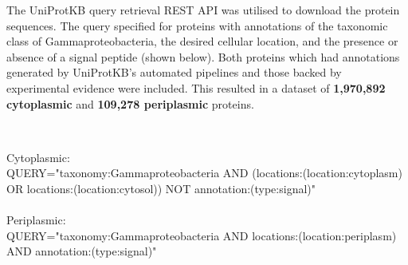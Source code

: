 The UniProtKB query retrieval REST API was utilised to download the protein sequences.
The query specified for proteins with annotations of the taxonomic class of Gammaproteobacteria, 
the desired cellular location,
and the presence or absence of a signal peptide (shown below).
Both proteins which had annotations generated by UniProtKB's automated pipelines and those backed by experimental evidence were included.
This resulted in a dataset of \textbf{1,970,892 cytoplasmic} and \textbf{109,278 periplasmic} proteins.

~\begin{tcolorbox}
Cytoplasmic:
\\
QUERY="taxonomy:Gammaproteobacteria AND (locations:(location:cytoplasm) OR locations:(location:cytosol)) NOT annotation:(type:signal)"
\\
\\
Periplasmic:
\\
QUERY="taxonomy:Gammaproteobacteria AND locations:(location:periplasm) AND annotation:(type:signal)"
~\end{tcolorbox}
